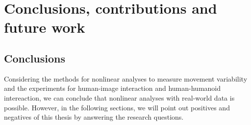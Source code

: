 		\chapter{Conclusions, contributions and future work}


\section{Conclusions}
Considering the methods for nonlinear analyses to measure movement variability
and the experiments for human-image interaction and human-humanoid intereaction, 
we can conclude that nonlinear analyses with real-world data is possible. 
However, in the following sections, we will point out positives
and negatives of this thesis by answering the research questions.

